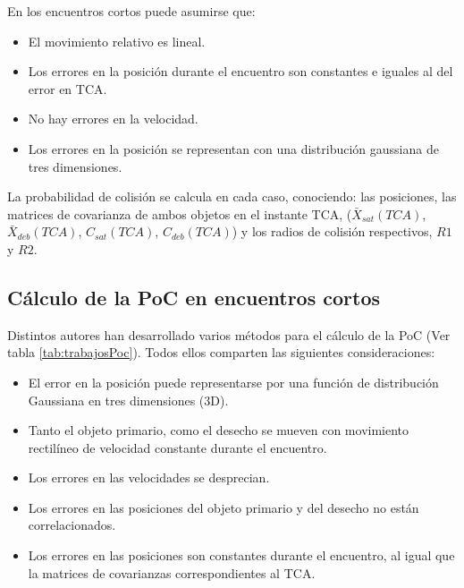 En los encuentros cortos puede asumirse que:\\

\begin{itemize}
\itemsep0em
 \item El movimiento relativo es lineal.
 \item Los errores en la posici\'on durante el encuentro son constantes e iguales al del error en TCA.
 \item No hay errores en la velocidad.
 \item Los errores en la posici\'on se representan con una distribuci\'on gaussiana de tres dimensiones.
\end{itemize}

La probabilidad de colisi\'on se calcula en cada caso, conociendo: las posiciones, las matrices de covarianza de ambos objetos en el instante TCA, ($\bar{X}_{sat}(TCA)$, $\bar{X}_{deb}(TCA)$, $C_{sat}(TCA)$, $C_{deb}(TCA)$) y los radios de colisi\'on respectivos, $R1$ y $R2$.

\subsection*{C\'alculo de la PoC en encuentros cortos}

Distintos autores han desarrollado varios m\'etodos para el c\'alculo de la PoC (Ver tabla \ref{tab:trabajosPoc}). Todos ellos comparten las siguientes consideraciones:\\
\begin{itemize}
\itemsep0em
\item El error en la posici\'on puede representarse por una funci\'on de distribuci\'on Gaussiana en tres dimensiones (3D).
\item Tanto el objeto primario, como el desecho se mueven con movimiento rectil\'ineo de velocidad constante durante el encuentro.
\item Los errores en las velocidades se desprecian.
\item Los errores en las posiciones del objeto primario y del desecho no est\'an correlacionados.
\item Los errores en las posiciones son constantes durante el encuentro, al igual que la matrices de covarianzas correspondientes al TCA.
\end{itemize}

